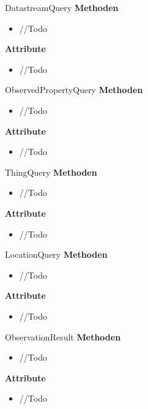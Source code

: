 \begin{Class}{DatastreamQuery}
    \textbf{Methoden}
    \begin{itemize}
        \item //Todo
    \end{itemize}
    
    \textbf{Attribute}
    \begin{itemize}
        \item //Todo
    \end{itemize}
\end{Class}

\begin{Class}{ObservedPropertyQuery}
    \textbf{Methoden}
    \begin{itemize}
        \item //Todo
    \end{itemize}
    
    \textbf{Attribute}
    \begin{itemize}
        \item //Todo
    \end{itemize}
\end{Class}

\begin{Class}{ThingQuery}
    \textbf{Methoden}
    \begin{itemize}
        \item //Todo
    \end{itemize}
    
    \textbf{Attribute}
    \begin{itemize}
        \item //Todo
    \end{itemize}
\end{Class}

\begin{Class}{LocationQuery}
    \textbf{Methoden}
    \begin{itemize}
        \item //Todo
    \end{itemize}
    
    \textbf{Attribute}
    \begin{itemize}
        \item //Todo
    \end{itemize}
\end{Class}

\begin{Class}{ObservationResult}
    \textbf{Methoden}
    \begin{itemize}
        \item //Todo
    \end{itemize}
    
    \textbf{Attribute}
    \begin{itemize}
        \item //Todo
    \end{itemize}
\end{Class}

